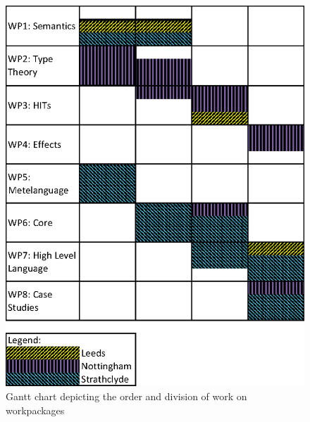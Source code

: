 \documentclass[a4paper,11pt]{article}
\begin{document}


\newpage
\begin{figure}
\centering
\includegraphics{Gantt.eps}
\caption{Gantt chart depicting the order and division of work on workpackages}
\end{figure}
\newpage

\begin{footnotesize}
\begin{twocolumn}

%
%

\end{twocolumn}
\end{footnotesize}

% 
% 
\end{document}
